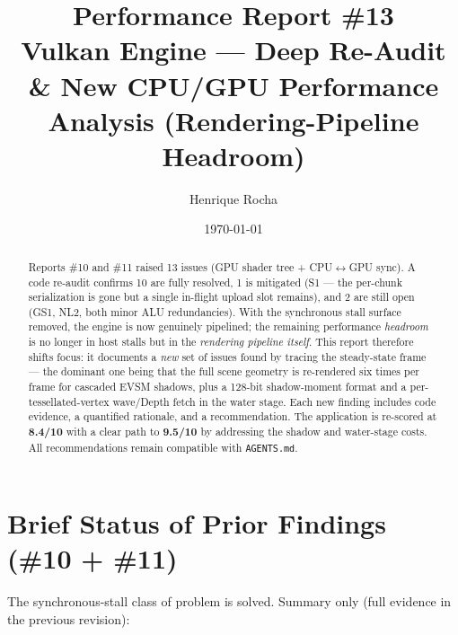 \documentclass[a4paper,12pt]{article}
\title{\textbf{Performance Report \#13}\\[4pt]
\large Vulkan Engine — Deep Re-Audit \& New CPU/GPU
Performance Analysis (Rendering-Pipeline Headroom)}
\author{Henrique Rocha}
\date{\today}
\begin{document}
\maketitle

\begin{abstract}
Reports \#10 and \#11 raised 13 issues (GPU shader tree + CPU$\leftrightarrow$GPU
sync). A code re-audit confirms 10 are fully resolved, 1 is mitigated (S1 — the
per-chunk serialization is gone but a single in-flight upload slot remains), and
2 are still open (GS1, NL2, both minor ALU redundancies). With the synchronous
stall surface removed, the engine is now genuinely pipelined; the remaining
performance \emph{headroom} is no longer in host stalls but in the \emph{rendering
pipeline itself}. This report therefore shifts focus: it documents a \emph{new}
set of issues found by tracing the steady-state frame — the dominant one being
that the full scene geometry is re-rendered six times per frame for cascaded
EVSM shadows, plus a 128-bit shadow-moment format and a per-tessellated-vertex
wave/Depth fetch in the water stage. Each new finding includes code evidence, a
quantified rationale, and a recommendation. The application is re-scored at
\textbf{8.4/10} with a clear path to \textbf{9.5/10} by addressing the shadow and
water-stage costs. All recommendations remain compatible with \texttt{AGENTS.md}.
\end{abstract}

\tableofcontents
\newpage

\section{Brief Status of Prior Findings (\#10 + \#11)}

The synchronous-stall class of problem is solved. Summary only (full evidence in
the previous revision):
\end{document}
